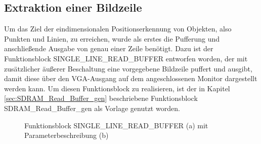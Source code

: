 \documentclass[ngerman,12pt]{article} %
\begin{document}
{\subsection{Extraktion einer Bildzeile}
\label{sec:Extrahieren einer Bildzeile}
Um das Ziel der eindimensionalen Positionserkennung von Objekten, also Punkten und Linien, zu erreichen, wurde als erstes die Pufferung und anschließende Ausgabe von genau einer Zeile benötigt. Dazu ist der Funktionsblock SINGLE\_LINE\_READ\_BUFFER entworfen worden, der mit zusätzlicher äußerer Beschaltung eine vorgegebene Bildzeile puffert und ausgibt, damit diese über den VGA-Ausgang auf dem angeschlossenen Monitor dargestellt werden kann. Um diesen Funktionsblock zu realisieren, ist der in Kapitel \ref{sec:SDRAM_Read_Buffer_gen} beschriebene Funktionsblock SDRAM\_Read\_Buffer\_gen als Vorlage genutzt worden.\\

\begin{figure}[h!tb]
  \centering
  \qquad
  \caption[Funktionsblock SINGLE\_LINE\_READ\_BUFFER mit Parameterbeschreibung]{\label{pic:SINGLE_LINE_READ_BUFFER}Funktionsblock SINGLE\_LINE\_READ\_BUFFER (a) mit Parameterbeschreibung (b)}
\end{figure}

}
\end{document}
